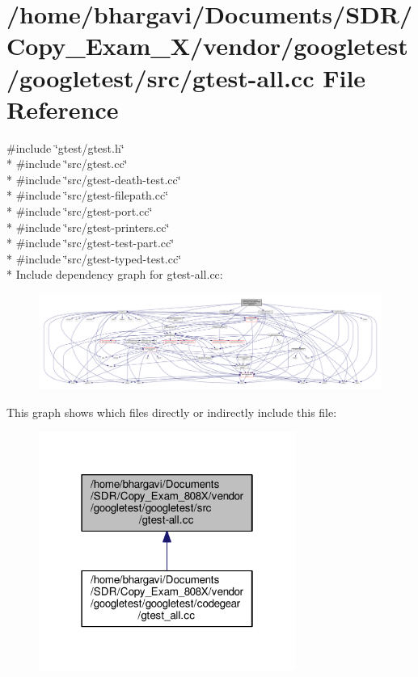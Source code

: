 \hypertarget{gtest-all_8cc}{}\section{/home/bhargavi/\+Documents/\+S\+D\+R/\+Copy\+\_\+\+Exam\+\_\+X/vendor/googletest/googletest/src/gtest-\/all.cc File Reference}
\label{gtest-all_8cc}
{\ttfamily \#include \char`\"{}gtest/gtest.\+h\char`\"{}}\\*
{\ttfamily \#include \char`\"{}src/gtest.\+cc\char`\"{}}\\*
{\ttfamily \#include \char`\"{}src/gtest-\/death-\/test.\+cc\char`\"{}}\\*
{\ttfamily \#include \char`\"{}src/gtest-\/filepath.\+cc\char`\"{}}\\*
{\ttfamily \#include \char`\"{}src/gtest-\/port.\+cc\char`\"{}}\\*
{\ttfamily \#include \char`\"{}src/gtest-\/printers.\+cc\char`\"{}}\\*
{\ttfamily \#include \char`\"{}src/gtest-\/test-\/part.\+cc\char`\"{}}\\*
{\ttfamily \#include \char`\"{}src/gtest-\/typed-\/test.\+cc\char`\"{}}\\*
Include dependency graph for gtest-\/all.cc\+:
\nopagebreak
\begin{figure}[H]
\begin{center}
\leavevmode
\includegraphics[width=350pt]{gtest-all_8cc__incl}
\end{center}
\end{figure}
This graph shows which files directly or indirectly include this file\+:
\nopagebreak
\begin{figure}[H]
\begin{center}
\leavevmode
\includegraphics[width=238pt]{gtest-all_8cc__dep__incl}
\end{center}
\end{figure}
